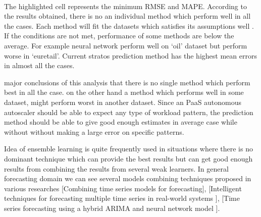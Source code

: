 \\The highlighted cell represents the minimum RMSE and MAPE. According to the results obtained, there is no an individual method which perform well in all the cases. Each method will fit the datasets which satisfies its assumptions well . If the conditions are not met, performance of some methods are below the average. For example neural network perform well on ‘oil’ dataset but perform worse in ‘euretail’.  Current stratos prediction method has the highest mean errors in almost all the cases.

major conclusions of this analysis that there is no single method which perform best in all the case. on the other hand a method which performs well in some dataset, might perform worst in another dataset.
Since an PaaS autonomous autoscaler should be able to expect any type of workload pattern, the prediction method should be able to give good enough estimates in average case while without without making a large error on specific patterns.

Idea of ensemble learning is quite frequently used in situations where there is no dominant technique which can provide the best results but can get good enough results from combining the results from several weak learners. In general forecasting domain we can see several models combining techniques  proposed in various researches [Combining time series models for forecasting], [Intelligent techniques for forecasting multiple time series in real-world systems ],
[Time series forecasting using a hybrid ARIMA and neural network model ].  

